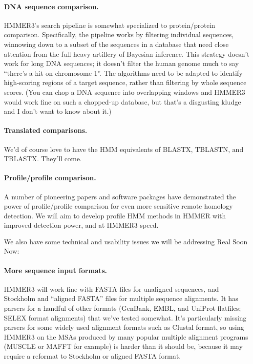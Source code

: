 \paragraph{DNA sequence comparison.} HMMER3's search pipeline is somewhat
specialized to protein/protein comparison. Specifically, the pipeline
works by filtering individual sequences, winnowing down to a subset of
the sequences in a database that need close attention from the full
heavy artillery of Bayesian inference. This strategy doesn't work for
long DNA sequences; it doesn't filter the human genome much to say
``there's a hit on chromosome 1''. The algorithms need to be adapted
to identify high-scoring regions of a target sequence, rather than
filtering by whole sequence scores. (You can chop a DNA sequence into
overlapping windows and HMMER3 would work fine on such a chopped-up
database, but that's a disgusting kludge and I don't want to know
about it.)

\paragraph{Translated comparisons.} We'd of course love to have the HMM
equivalents of BLASTX, TBLASTN, and TBLASTX. They'll come.

\paragraph{Profile/profile comparison.} A number of pioneering papers and
software packages have demonstrated the power of profile/profile
comparison for even more sensitive remote homology detection. We will
aim to develop profile HMM methods in HMMER with improved detection
power, and at HMMER3 speed.

\vspace{2em}

We also have some technical and usability issues we will be addressing
Real Soon Now:

\paragraph{More sequence input formats.} HMMER3 will work fine with FASTA
files for unaligned sequences, and Stockholm and ``aligned FASTA''
files for multiple sequence alignments. It has parsers for a handful
of other formats (GenBank, EMBL, and UniProt flatfiles; SELEX format
alignments) that we've tested somewhat. It's particularly missing
parsers for some widely used alignment formats such as Clustal format,
so using HMMER3 on the MSAs produced by many popular multiple
alignment programs (MUSCLE or MAFFT for example) is harder than it
should be, because it may require a reformat to Stockholm or aligned
FASTA format.

